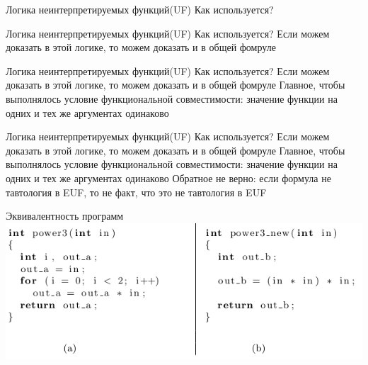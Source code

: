 \documentclass{beamer}
\begin{document}
\begin{frame}{Логика неинтерпретируемых функций(UF)}
Как используется?\newline
\end{frame}

\begin{frame}{Логика неинтерпретируемых функций(UF)}
Как используется?\newline
Если можем доказать в этой логике, то можем доказать и в общей фомруле
\end{frame}

\begin{frame}{Логика неинтерпретируемых функций(UF)}
Как используется?\newline
Если можем доказать в этой логике, то можем доказать и в общей фомруле\newline
Главное, чтобы выполнялось условие функциональной совместимости: значение функции на одних и тех же аргументах одинаково
\end{frame}

\begin{frame}{Логика неинтерпретируемых функций(UF)}
Как используется?\newline
Если можем доказать в этой логике, то можем доказать и в общей фомруле\newline
Главное, чтобы выполнялось условие функциональной совместимости: значение функции на одних и тех же аргументах одинаково\newline
Обратное не верно: если формула не тавтология в EUF, то не факт, что это не тавтология в EUF
\end{frame}

\begin{frame}{Эквивалентность программ}
\includegraphics[scale=0.5]{power3.png}
\end{frame}
\end{document}
